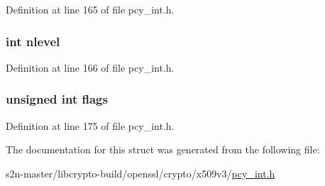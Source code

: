 Definition at line 165 of file pcy\+\_\+int.\+h.

\subsubsection[{\texorpdfstring{nlevel}{nlevel}}]{\setlength{\rightskip}{0pt plus 5cm}int nlevel}\hypertarget{struct_x509___p_o_l_i_c_y___t_r_e_e__st_aa0a4742547c0f19f01409ff51fc9a19d}{}\label{struct_x509___p_o_l_i_c_y___t_r_e_e__st_aa0a4742547c0f19f01409ff51fc9a19d}


Definition at line 166 of file pcy\+\_\+int.\+h.

\subsubsection[{\texorpdfstring{flags}{flags}}]{\setlength{\rightskip}{0pt plus 5cm}unsigned int flags}\hypertarget{struct_x509___p_o_l_i_c_y___t_r_e_e__st_ac92588540e8c1d014a08cd8a45462b19}{}\label{struct_x509___p_o_l_i_c_y___t_r_e_e__st_ac92588540e8c1d014a08cd8a45462b19}


Definition at line 175 of file pcy\+\_\+int.\+h.



The documentation for this struct was generated from the following file\+:\begin{DoxyCompactItemize}
\item 
s2n-\/master/libcrypto-\/build/openssl/crypto/x509v3/\hyperlink{pcy__int_8h}{pcy\+\_\+int.\+h}\end{DoxyCompactItemize}
